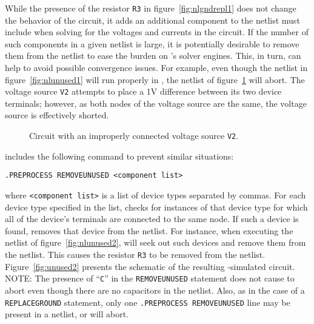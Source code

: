 While the presence of the resistor \texttt{R3} in figure\ \ref{fig:nlgndrepl1} does not 
change the behavior of the circuit, it adds an additional component to 
the netlist  \Xyce{} must include when solving for the voltages and 
currents in the circuit.  If the number of such components in a given netlist
is large, it is potentially desirable to remove them from the
netlist to ease the burden on \Xyce's solver engines.  This, in turn, can help
to avoid possible convergence issues.  For example, even though the netlist in
figure\ \ref{fig:nlunused1} will run properly in \Xyce{}, the netlist of figure\ 
\ref{fig:nlunused3} will abort.  The voltage source \texttt{V2} attempts to place
a 1V difference between its two device terminals; however, as both nodes of
the voltage source are the same, the voltage source is effectively shorted.

\begin{figure}[htbp]
\begin{centering}
\caption[Circuit with an improperly connected voltage source.] {Circuit with an improperly connected voltage source \texttt{V2}.}
\label{fig:nlunused3}
\end{centering}
\end{figure}

\Xyce{} includes the following command to prevent similar situations:

\texttt{.PREPROCESS REMOVEUNUSED <component list>}

where \texttt{<component list>} is a list of device types separated by commas.
For each device type specified in the list, \Xyce{} checks for instances of
that device type for which all of the device's terminals are connected to the
same node.  If such a device is found, \Xyce{} removes that device from the
netlist.  For instance, when executing the netlist of figure\ \ref{fig:nlunused2},
\Xyce{} will seek out such devices and remove them from the netlist.  This causes the
resistor \texttt{R3} to be removed from the netlist. Figure\ \ref{fig:unused2} presents the schematic of the 
resulting \Xyce{}-simulated circuit.  
NOTE:	The presence of  ``\texttt{C}'' in the \texttt{REMOVEUNUSED} statement does
not cause \Xyce{} to abort even though there are no capacitors in the netlist.
Also, as in the case of a \texttt{REPLACEGROUND} statement, only one 
\texttt{.PREPROCESS REMOVEUNUSED} line may be present in a netlist, or \Xyce{} will abort.

